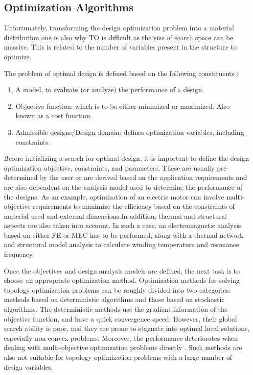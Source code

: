 \subsection{Optimization Algorithms}
\label{sec:MDP_Optimiaztion_Algorithms}

Unfortunately, transforming the design optimization problem into a material distribution one is also why TO is difficult as the size of search space can be massive. This is related to the number of variables present in the structure to optimize. 

The problem of optimal design is defined based on the following constituents \parencite{allaire2019homogenization}:

\begin{enumerate}
    \item A model, to evaluate (or analyze) the performance of a design.
    \item Objective function: which is to be either minimized or maximized. Also known as a cost function.
    \item Admissible designs/Design domain: defines optimization variables, including constraints.
\end{enumerate}

Before initializing a search for optimal design, it is important to define the design optimization objective, constraints, and parameters. These are usually pre-determined by the user or are derived based on the application requirements and are also dependent on the analysis model used to determine the performance of the designs. As an example, optimization of an electric motor can involve multi-objective requirements to maximize the efficiency based on the constraints of material used and external dimensions.In addition, thermal and structural aspects are also taken into account. In such a case, an electromagnetic analysis based on either FE or MEC has to be performed, along with a thermal network and structural model analysis to calculate winding temperature and resonance frequency. 

Once the objectives and design analysis models are defined, the next task is to choose an appropriate optimization method. Optimization  methods  for  solving  topology  optimization  problems  can  be  roughly divided  into  two  categories:  methods  based  on deterministic  algorithms  and  those  based  on stochastic  algorithms. The deterministic methods use  the  gradient  information  of  the objective  function,  and  have  a  quick  convergence  speed. However, their global search ability is poor, and they are prone to stagnate into optimal local solutions, especially non-convex problems. Moreover,  the performance deteriorates when  dealing  with  multi-objective optimization problems directly \parencite{li2019numerical}. Such methods are also not suitable for topology optimization problems with a large number of design variables.


